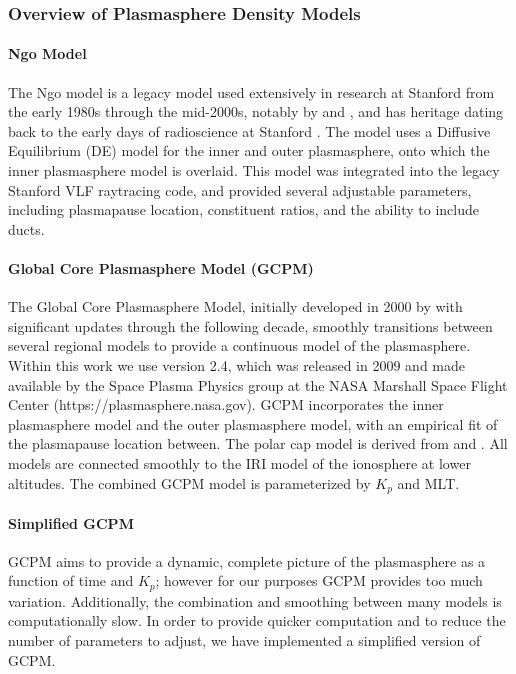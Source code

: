 \subsubsection{Overview of Plasmasphere Density Models}
\label{section:plasmasphere_density_models}
\paragraph{Ngo Model}

The Ngo model is a legacy model used extensively in research at Stanford from the early 1980s through the mid-2000s, notably by \cite{Lauben1998} and \cite{Bortnik2005}, and has heritage dating back to the early days of radioscience at Stanford \citep{Kimura1966}. The model uses a Diffusive Equilibrium (DE) \citep{Angerami1963} model for the inner and outer plasmasphere, onto which the \cite{Carpenter1992} inner plasmasphere model is overlaid. This model was integrated into the legacy Stanford VLF raytracing code, and provided several adjustable parameters, including plasmapause location, constituent ratios, and the ability to include ducts.

\paragraph{Global Core Plasmasphere Model (GCPM)}

The Global Core Plasmasphere Model, initially developed in 2000 by \cite{Gallagher1999} with significant updates through the following decade, smoothly transitions between several regional models to provide a continuous model of the plasmasphere. Within this work we use version 2.4, which was released in 2009 and made available by the Space Plasma Physics group at the NASA Marshall Space Flight Center (https://plasmasphere.nasa.gov). GCPM incorporates the \cite{Carpenter1992} inner plasmasphere model and the \cite{Gallagher1995} outer plasmasphere model, with an empirical fit of the plasmapause location between. The polar cap model is derived from \cite{Persoon1983} and \cite{Chandler1991}. All models are connected smoothly to the IRI model of the ionosphere at lower altitudes. The combined GCPM model is parameterized by $K_p$ and MLT.

\paragraph{Simplified GCPM}

GCPM aims to provide a dynamic, complete picture of the plasmasphere as a function of time and $K_p$; however for our purposes GCPM provides too much variation. Additionally, the combination and smoothing between many models is computationally slow. In order to provide quicker computation and to reduce the number of parameters to adjust, we have implemented a simplified version of GCPM.

